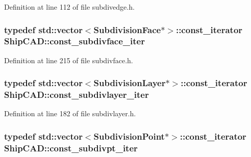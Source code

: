 Definition at line 112 of file subdivedge.\+h.

\subsubsection[{\texorpdfstring{const\+\_\+subdivface\+\_\+iter}{const_subdivface_iter}}]{\setlength{\rightskip}{0pt plus 5cm}typedef std\+::vector$<${\bf Subdivision\+Face}$\ast$$>$\+::const\+\_\+iterator {\bf Ship\+C\+A\+D\+::const\+\_\+subdivface\+\_\+iter}}\hypertarget{namespaceShipCAD_a6371e9995f829935912575008f969c1c}{}\label{namespaceShipCAD_a6371e9995f829935912575008f969c1c}


Definition at line 215 of file subdivface.\+h.

\subsubsection[{\texorpdfstring{const\+\_\+subdivlayer\+\_\+iter}{const_subdivlayer_iter}}]{\setlength{\rightskip}{0pt plus 5cm}typedef std\+::vector$<${\bf Subdivision\+Layer}$\ast$$>$\+::const\+\_\+iterator {\bf Ship\+C\+A\+D\+::const\+\_\+subdivlayer\+\_\+iter}}\hypertarget{namespaceShipCAD_a269f54ad41c7de4f7862170413569d4d}{}\label{namespaceShipCAD_a269f54ad41c7de4f7862170413569d4d}


Definition at line 182 of file subdivlayer.\+h.

\subsubsection[{\texorpdfstring{const\+\_\+subdivpt\+\_\+iter}{const_subdivpt_iter}}]{\setlength{\rightskip}{0pt plus 5cm}typedef std\+::vector$<${\bf Subdivision\+Point}$\ast$$>$\+::const\+\_\+iterator {\bf Ship\+C\+A\+D\+::const\+\_\+subdivpt\+\_\+iter}}\hypertarget{namespaceShipCAD_ac2eb7686c5b725b6d2853c95bbd0a1f9}{}\label{namespaceShipCAD_ac2eb7686c5b725b6d2853c95bbd0a1f9}


